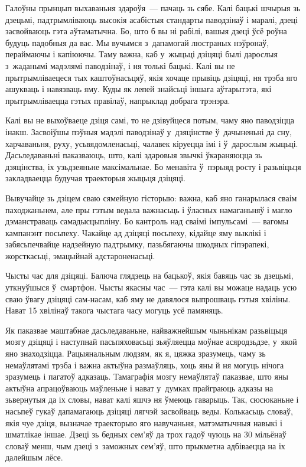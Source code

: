 Галоўны прынцып выхаваньня здароўя~--- пачаць зь сябе. Калі бацькі шчырыя зь дзецьмі, падтрымліваюць высокія асабістыя стандарты паводзінаў і маралі, дзеці засвойваюць гэта аўтаматычна. Бо, што б вы ні рабілі, вашыя дзеці ўсё роўна будуць падобныя да вас. Мы вучымся з~дапамогай люстраных нэўронаў, пераймаючы і капіюючы. Таму важна, каб у~жыцьці дзіцяці былі дарослыя з~жаданымі мадэлямі паводзінаў, і ня толькі бацькі. Калі вы не прытрымліваецеся тых каштоўнасьцяў, якія хочаце прывіць дзіцяці, ня трэба яго ашукваць і навязваць яму. Куды як лепей знайсьці іншага аўтарытэта, які прытрымліваецца гэтых правілаў, напрыклад добрага трэнэра.

Калі вы не выхоўваеце дзіця самі, то не дзівуйцеся потым, чаму яно паводзіцца інакш. Засвоіўшы пэўныя мадэлі паводзінаў у~дзяцінстве ў~дачыненьні да сну, харчаваньня, руху, усьвядомленасьці, чалавек кіруецца імі і ў~дарослым жыцьці. Дасьледаваньні паказваюць, што, калі здаровыя звычкі ўкараняюцца зь дзяцінства, іх узьдзеяньне максімальнае. Бо менавіта ў~пэрыяд росту і разьвіцьця закладваецца будучая траекторыя жыцьця дзіцяці.

Вывучайце зь дзіцем сваю сямейную гісторыю: важна, каб яно ганарылася сваім паходжаньнем, але пры гэтым ведала важнасьць і ўласных намаганьняў і магло дэманстраваць самадысцыпліну. Бо кантроль над сваімі імпульсамі~--- вагомы кампанэнт посьпеху. Чакайце ад дзіцяці посьпеху, кідайце яму выклікі і забясьпечвайце надзейную падтрымку, пазьбягаючы шкодных гіпэрапекі, жорсткасьці, эмацыйнай адстароненасьці.

Чысты час для дзіцяці. Балюча глядзець на бацькоў, якія бавяць час зь дзецьмі, уткнуўшыся ў~смартфон. Чысты якасны час~--- гэта калі вы можаце надаць усю сваю ўвагу дзіцяці сам-насам, каб яму не давялося выпрошваць гэтыя хвіліны. Нават 15 хвілінаў такога чыстага часу могуць усё памяняць.

Як паказвае маштабнае дасьледаваньне, найважнейшым чыньнікам разьвіцьця мозгу дзіцяці і наступнай пасьпяховасьці зьяўляецца моўнае асяродзьдзе, у~якой яно знаходзіцца. Рацыянальным людзям, як я, цяжка зразумець, чаму зь немаўлятамі трэба і важна актыўна размаўляць, хоць яны й ня могуць нічога зразумець і пагатоў адказаць. Тамаграфія мозгу немаўлятаў паказвае, што яны актыўна апрацоўваюць маўленьне і нават у~думках прайграюць адказы на зьвернутыя да іх словы, нават калі яшчэ ня ўмеюць гаварыць. Так, сюсюканьне і насьпеў гукаў дапамагаюць дзіцяці лягчэй засвойваць веды. Колькасьць словаў, якія чуе дзіця, вызначае траекторыю яго навучаньня, матэматычныя навыкі і шматлікае іншае. Дзеці зь бедных сем'яў да трох гадоў чуюць на 30 мільёнаў словаў менш, чым дзеці з~заможных сем'яў, што прыкметна адбіваецца на іх далейшым лёсе.

